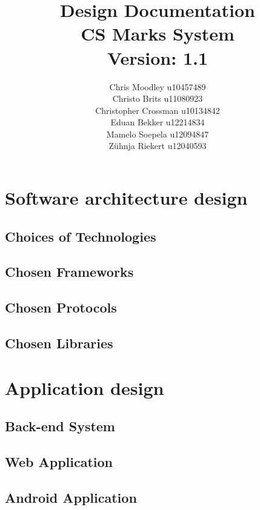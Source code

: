 \documentclass[12pt,a4paper]{article}
\begin{document}
\begin{titlepage}
\title{Design Documentation\\CS Marks System\\ \small Version: 1.1}
\author{
Chris Moodley u10457489\\
Christo Brits u11080923\\
Christopher Crossman u10134842\\
Eduan Bekker u12214834\\
Mamelo Soepela u12094847\\
Z\"uhnja Riekert u12040593
}
\maketitle
\end{titlepage}
\tableofcontents
\pagebreak
\section{Software architecture design}
\subsection{Choices of Technologies}
\subsection{Chosen Frameworks}
\subsection{Chosen Protocols}
\subsection{Chosen Libraries}
\pagebreak
\section{Application design}
\subsection{Back-end System}
\subsection{Web Application}

\subsection{Android Application}
\end{document}
